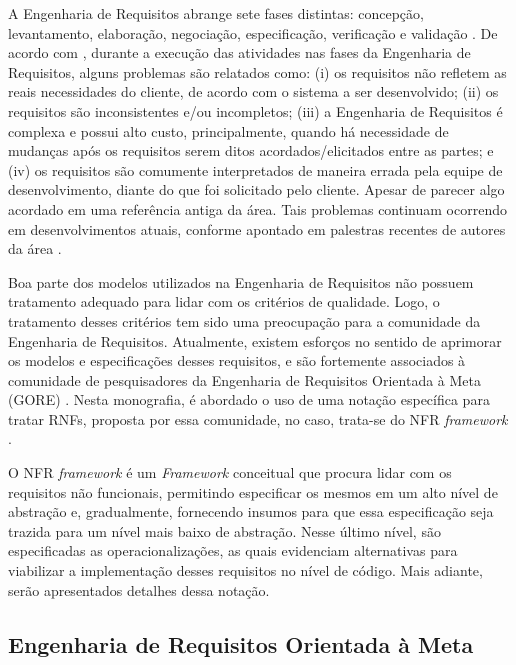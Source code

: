 A Engenharia de Requisitos abrange sete fases distintas: concepção, levantamento, elaboração, negociação, especificação, verificação e validação \cite{pressman2011engenharia}. De acordo com \cite{kotonya1998requirements}, durante a execução das atividades nas fases da Engenharia de Requisitos, alguns problemas são relatados como: (i) os requisitos não refletem as reais necessidades do cliente, de acordo com o sistema a ser desenvolvido; (ii) os requisitos são inconsistentes e/ou incompletos; (iii) a Engenharia de Requisitos é complexa e possui alto custo, principalmente, quando há necessidade de mudanças após os requisitos serem ditos acordados/elicitados entre as partes; e (iv) os requisitos são comumente interpretados de maneira errada pela equipe de desenvolvimento, diante do que foi solicitado pelo cliente. Apesar de parecer algo acordado em uma referência antiga da área. Tais problemas continuam ocorrendo em desenvolvimentos atuais, conforme apontado em palestras recentes de autores da área \cite{palestrasilvio}. 

Boa parte dos modelos utilizados na Engenharia de Requisitos não possuem tratamento adequado para lidar com os critérios de qualidade. Logo, o tratamento desses critérios tem sido uma preocupação para a comunidade da Engenharia de Requisitos. Atualmente, existem esforços no sentido de aprimorar os modelos e especificações desses requisitos, e são fortemente associados à comunidade de pesquisadores da Engenharia de Requisitos Orientada à Meta (GORE) \cite{chung2012non}. Nesta monografia, é abordado o uso de uma notação específica para tratar RNFs, proposta por essa comunidade, no caso, trata-se do NFR \textit{framework} \cite{chung2012non}. 

O NFR \textit{framework} é um \textit{Framework} conceitual que procura lidar com os requisitos não funcionais, permitindo especificar os mesmos em um alto nível de abstração e, gradualmente, fornecendo insumos para que essa especificação seja trazida para um nível mais baixo de abstração. Nesse último nível, são especificadas as operacionalizações, as quais evidenciam alternativas para viabilizar a implementação desses requisitos no nível de código. Mais adiante, serão apresentados detalhes dessa notação.

\subsection{Engenharia de Requisitos Orientada à Meta}
\label{subsec:orientacaoMeta}

